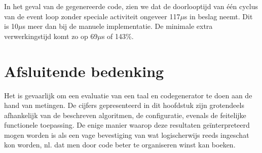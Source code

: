 In het geval van de gegenereerde code, zien we dat de doorlooptijd van \'e\'en
cyclus van de event loop zonder speciale activiteit ongeveer 117$\mu$s in
beslag neemt. Dit is 10$\mu$s meer dan bij de manuele implementatie. De
minimale extra verwerkingstijd komt zo op 69$\mu$s of 143\%.

\section{Afsluitende bedenking}

Het is gevaarlijk om een evaluatie van een taal en codegenerator te doen aan de
hand van metingen. De cijfers gepresenteerd in dit hoofdstuk zijn grotendeels
afhankelijk van de beschreven algoritmen, de configuratie, evenals de
feitelijke functionele toepassing. De enige manier waarop deze resultaten
ge\"interpreteerd mogen worden is als een vage bevestiging van wat
logischerwijs reeds ingeschat kon worden, nl. dat men door code beter te
organiseren winst kan boeken.
